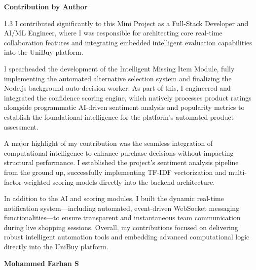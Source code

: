 \documentclass[a4paper,12pt]{article}
\begin{document}
\newpage
\thispagestyle{empty}
\begin{center}
{\Large \textbf{Contribution by Author}}\\[1cm]
\end{center}
\begin{spacing}{1.3}
I contributed significantly to this Mini Project as a Full-Stack Developer and AI/ML Engineer, where I was responsible for architecting core real-time collaboration features and integrating embedded intelligent evaluation capabilities into the UniBuy platform.

I spearheaded the development of the Intelligent Missing Item Module, fully implementing the automated alternative selection system and finalizing the Node.js background auto-decision worker. As part of this, I engineered and integrated the confidence scoring engine, which natively processes product ratings alongside programmatic AI-driven sentiment analysis and popularity metrics to establish the foundational intelligence for the platform's automated product assessment.

A major highlight of my contribution was the seamless integration of computational intelligence to enhance purchase decisions without impacting structural performance. I established the project's sentiment analysis pipeline from the ground up, successfully implementing TF-IDF vectorization and multi-factor weighted scoring models directly into the backend architecture.

In addition to the AI and scoring modules, I built the dynamic real-time notification system---including automated, event-driven WebSocket messaging functionalities---to ensure transparent and instantaneous team communication during live shopping sessions. Overall, my contributions focused on delivering robust intelligent automation tools and embedding advanced computational logic directly into the UniBuy platform.

\begin{flushright}
\textbf{Mohammed Farhan S}
\end{flushright}
\end{spacing}
\end{document}
